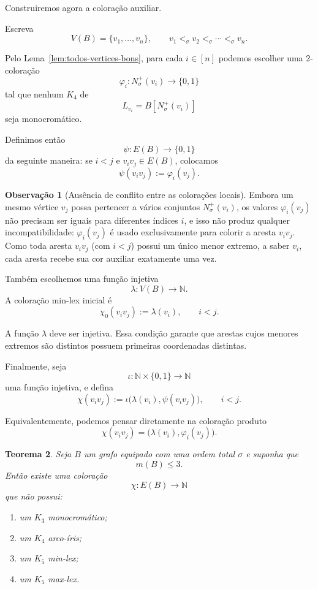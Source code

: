 \documentclass[reqno, 12pt]{amsart}
\numberwithin{equation}{section}
\theoremstyle{plain}
\newtheorem{theorem}{Teorema}[section]
\theoremstyle{definition}
\newtheorem{remark}[theorem]{Observação}
\begin{document}
Construiremos agora a coloração auxiliar.

Escreva
\[
  V(B)=\{v_1,\ldots,v_n\},
  \qquad
  v_1<_\sigma v_2<_\sigma\cdots<_\sigma v_n.
\]

Pelo Lema~\ref{lem:todos-vertices-bons}, para cada
$i\in[n]$ podemos escolher uma 2-coloração
\[
  \varphi_i:
  N_\sigma^+(v_i)\longrightarrow\{0,1\}
\]
tal que nenhum $K_4$ de
\[
  L_{v_i}=B[N_\sigma^+(v_i)]
\]
seja monocromático.

Definimos então
\[
  \psi:E(B)\longrightarrow\{0,1\}
\]
da seguinte maneira: se $i<j$ e $v_iv_j\in E(B)$, colocamos
\[
  \psi(v_iv_j):=\varphi_i(v_j).
\]

\begin{remark}[Ausência de conflito entre as colorações locais]
  \label{rem:sem-conflito-phi}
  Embora um mesmo vértice $v_j$ possa pertencer a vários conjuntos $N_\sigma^+(v_i)$, os valores $\varphi_i(v_j)$ não precisam ser iguais para diferentes índices $i$, e isso não produz qualquer incompatibilidade: $\varphi_i(v_j)$ é usado exclusivamente para colorir a aresta $v_iv_j$. Como toda aresta $v_iv_j$ (com $i < j$) possui um único menor extremo, a saber $v_i$, cada aresta recebe sua cor auxiliar exatamente uma vez.
\end{remark}

Também escolhemos uma função injetiva
\[
  \lambda:V(B)\longrightarrow\mathbb{N}.
\]
A coloração min-lex inicial é
\[
  \chi_0(v_iv_j):=\lambda(v_i),
  \qquad i<j.
\]

A função $\lambda$ deve ser injetiva. Essa condição garante que
arestas cujos menores extremos são distintos possuem primeiras
coordenadas distintas.

Finalmente, seja
\[
  \iota:
  \mathbb{N}\times\{0,1\}
  \longrightarrow
  \mathbb{N}
\]
uma função injetiva, e defina
\[
  \chi(v_iv_j)
  :=
  \iota\bigl(\lambda(v_i),\psi(v_iv_j)\bigr),
  \qquad i<j.
\]

Equivalentemente, podemos pensar diretamente na coloração produto
\[
  \chi(v_iv_j)
  =
  \bigl(\lambda(v_i),\varphi_i(v_j)\bigr).
\]

\begin{theorem}
  \label{thm:coloracao-links-direita-completa}
  Seja $B$ um grafo equipado com uma ordem total $\sigma$ e suponha que
  \[
    m(B)\leq 3.
  \]
  Então existe uma coloração
  \[
    \chi:E(B)\longrightarrow\mathbb{N}
  \]
  que não possui:
  \begin{enumerate}
    \item[(i)] um $K_3$ monocromático;
    \item[(ii)] um $K_4$ arco-íris;
    \item[(iii)] um $K_5$ min-lex;
    \item[(iv)] um $K_5$ max-lex.
  \end{enumerate}
\end{theorem}
\end{document}
